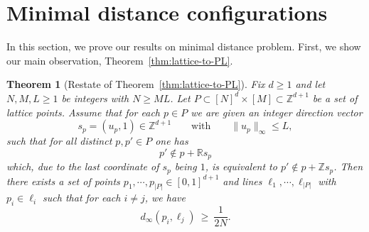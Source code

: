 \documentclass[12pt,reqno]{amsart}
\theoremstyle{plain}
\newtheorem{theorem}{Theorem}[section]
\theoremstyle{definition}
\newcommand{\1}{\mathbf{1}}
\begin{document}
\section{Minimal distance configurations} 
\label{sec:Heilbronn}
In this section, we prove our results on minimal distance problem. First, we show our main observation, Theorem~\ref{thm:lattice-to-PL}.

\begin{theorem}[Restate of Theorem~\ref{thm:lattice-to-PL}]
Fix $d\ge 1$ and let $N,M,L\ge 1$ be integers with $N\ge ML$.
Let $P\subset [N]^d\times [M]\subset \mathbb{Z}^{d+1}$ be a set of lattice points.
Assume that for each $p\in P$ we are given an integer direction vector
\[
  s_p=(u_p,1)\in \mathbb{Z}^{d+1}
  \qquad\text{with}\qquad
  \|u_p\|_\infty\le L,
\]
such that for all distinct $p,p'\in P$ one has
\[
  p'\notin p+\mathbb{R}s_p
\]
which, due to the last coordinate of $s_p$ being $1$, is equivalent to $p'\notin p+\mathbb{Z}s_p$. Then there exists a set of points $p_1, \cdots, p_{|P|} \in [0, 1]^{d + 1}$ and lines $\ell_1, \cdots, \ell_{|P|}$ with $p_i \in \ell_i$ such that for each $i \neq j$, we have
\[
  d_\infty(p_i, \ell_j)\ \ge\ \frac{1}{2N}.
\]
\end{theorem}
\end{document}
